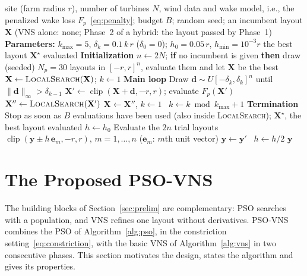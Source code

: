 \begin{algorithm}[!htb]
\caption{Basic VNS for the WFLOP as implemented (complete procedure; every call of $F_p$ counts against the budget $B$).}
\label{alg:vns}
\small
\begin{algorithmic}[1]
\Require site (farm radius $r$), number of turbines $N$, wind data and wake model, i.e., the penalized wake loss $F_p$~\eqref{eq:penalty}; budget $B$; random seed; an incumbent layout $\mathbf X$ (VNS alone: none; Phase~2 of a hybrid: the layout passed by Phase~1)
\Statex \textbf{Parameters:} $k_{\max}=5$, $\delta_k=0.1\,k\,r$ ($\delta_0=0$); $h_0=0.05\,r$, $h_{\min}=10^{-3}r$
\Ensure the best layout $\mathbf X^\star$ evaluated
\Statex \textbf{Initialization}
\State $n\gets2N$; \textbf{if} no incumbent is given \textbf{then} draw (seeded) $N_p=30$ layouts in $[-r,r]^n$, evaluate them and let $\mathbf X$ be the best 
\State $\mathbf X\gets\textsc{LocalSearch}(\mathbf X)$; $k\gets1$
\Statex \textbf{Main loop}
    \State Draw $\mathbf d\sim U[-\delta_k,\delta_k]^n$ until $\lVert\mathbf d\rVert_\infty>\delta_{k-1}$ 
    \State $\mathbf X'\gets\operatorname{clip}(\mathbf X+\mathbf d,-r,r)$; evaluate $F_p(\mathbf X')$
    \State $\mathbf X''\gets\textsc{LocalSearch}(\mathbf X')$
     $\mathbf X\gets\mathbf X''$, $k\gets1$ 
    \Else\ $k\gets k\bmod k_{\max}+1$ 
    \EndIf
\EndWhile
\Statex \textbf{Termination}
\State Stop as soon as $B$ evaluations have been used (also inside \textsc{LocalSearch}); \Return $\mathbf X^\star$, the best layout evaluated
\Statex
{} 
    \State $h\gets h_0$
        \State Evaluate the $2n$ trial layouts $\operatorname{clip}(\mathbf y\pm h\,\mathbf e_m,-r,r)$, $m=1,\ldots,n$ ($\mathbf e_m$: $m$th unit vector)
         $\mathbf y\gets\mathbf y'$ \Else\ $h\gets h/2$
        \EndIf
    \EndWhile
    \State \Return $\mathbf y$
\EndFunction
\end{algorithmic}
\end{algorithm}

\section{The Proposed PSO-VNS}
\label{sec:psovns-method}
The building blocks of Section~\ref{sec:prelim} are complementary: PSO searches with a population, and VNS refines one layout without derivatives. PSO-VNS combines the PSO of Algorithm~\ref{alg:pso}, in the constriction setting~\eqref{eq:constriction}, with the basic VNS of Algorithm~\ref{alg:vns} in two consecutive phases. This section motivates the design, states the algorithm and gives its properties.

